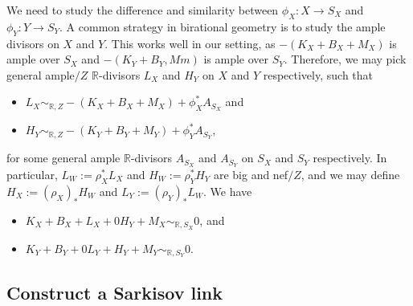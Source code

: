 \documentclass[11pt]{amsart}
\numberwithin{equation}{section}
\newcommand{\Rr}{\mathbb{R}}
\theoremstyle{definition}
\theoremstyle{definition}
\theoremstyle{definition}
\begin{document}
We need to study the difference and similarity between $\phi_X: X\rightarrow S_X$ and $\phi_Y: Y\rightarrow S_Y$. A common strategy in birational geometry is to study the ample divisors on $X$ and $Y$. This works well in our setting, as $-(K_X+B_X+M_X)$ is ample over $S_X$ and  $-(K_Y+B_Y,Mm)$ is ample over $S_Y$. Therefore, we may pick general ample$/Z$ $\Rr$-divisors $L_X$ and $H_Y$ on $X$ and $Y$ respectively, such that
\begin{itemize}
    \item $L_X\sim_{\Rr,Z}-(K_X+B_X+M_X)+\phi_X^*A_{S_X}$ and
    \item $H_Y\sim_{\Rr,Z}-(K_Y+B_Y+M_Y)+\phi_Y^*A_{S_Y}$, 
\end{itemize}
for some general ample $\Rr$-divisors $A_{S_X}$ and $A_{S_Y}$ on $S_X$ and $S_Y$ respectively. In particular, $L_W:=\rho_X^*L_X$ and $H_W:=\rho_Y^*H_Y$ are big and nef$/Z$, and we may define $H_X:=(\rho_X)_*H_W$ and $L_Y:=(\rho_Y)_*L_W$. We have
\begin{itemize}
    \item $K_X+B_X+L_X+0H_Y+M_X\sim_{\mathbb R,S_X}0$, and
    \item $K_Y+B_Y+0L_Y+H_Y+M_Y\sim_{\mathbb R,S_Y}0$.

\end{itemize}

\subsection{Construct a Sarkisov link}
\end{document}
